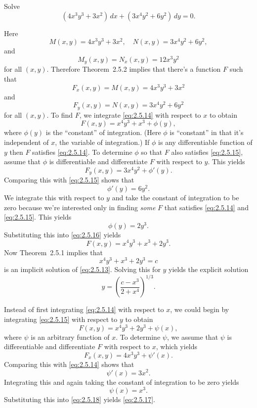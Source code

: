 \setcounter{example}{2}
\setcounter{equation}{12}
\begin{example}
  \label{example:2.5.3} \rm Solve
  \begin{equation}
    \label{eq:2.5.13}(4x^{3}y^{3}+3x^{2})\,dx+(3x^{4}y^{2}+6y^{2})\,dy=0.
  \end{equation}
\end{example}
\setcounter{equation}{13}
\setcounter{figure}{0}
\begin{examplesolution}
 Here
\[
  M(x,y)=4x^{3}y^{3}+3x^{2},\quad N(x,y)=3x^{4}y^{2}+6y^{2},
\]
and
\[
  M_{y}(x,y)=N_{x}(x,y)=12x^{3}y^{2}
\]
for all $(x,y)$. Therefore Theorem~2.5.2 implies that there's a function $F$ such that
\begin{equation}
  \label{eq:2.5.14}F_{x}(x,y)=M(x,y)=4x^{3}y^{3}+3x^{2}
\end{equation}
and
\begin{equation}
  \label{eq:2.5.15}F_{y}(x,y)=N(x,y)=3x^{4}y^{2}+6y^{2}
\end{equation}
for all $(x,y)$. To find $F$, we integrate \eqref{eq:2.5.14} with respect to $x$ to obtain
\begin{equation}
  \label{eq:2.5.16}F(x,y)=x^{4}y^{3}+x^{3}+\phi(y),
\end{equation}
where $\phi(y)$ is the ``constant'' of integration. (Here $\phi$ is ``constant'' in that it's
independent of $x$, the variable of integration.) If $\phi$ is any differentiable function of $y$
then $F$ satisfies \eqref{eq:2.5.14}. To determine $\phi$ so that $F$ also satisfies
\eqref{eq:2.5.15}, assume that $\phi$ is differentiable and differentiate $F$ with respect to $y$.
This yields
\[
  F_{y}(x,y)=3x^{4}y^{2}+\phi'(y).
\]
Comparing this with \eqref{eq:2.5.15} shows that
\[
  \phi'(y)=6y^{2}.
\]
We integrate this with respect to $y$ and take the constant of integration to be zero because we're
interested only in finding {\relax\it some} $F$ that satisfies \eqref{eq:2.5.14} and
\eqref{eq:2.5.15}. This yields
\[
  \phi(y)=2y^{3}.
\]
Substituting this into \eqref{eq:2.5.16} yields
\begin{equation}
  \label{eq:2.5.17}F(x,y)=x^{4}y^{3}+x^{3}+2y^{3}.
\end{equation}
Now Theorem~2.5.1 implies that
\[
  x^{4}y^{3}+x^{3}+2y^{3}=c
\]
is an implicit solution of \eqref{eq:2.5.13}. Solving this for $y$ yields the explicit solution
\[
  y=\left(\frac{c-x^{3}}{2+x^{4}}\right)^{1/3}.
\]

 Instead of first integrating \eqref{eq:2.5.14} with respect to $x$, we could
begin by integrating \eqref{eq:2.5.15} with respect to $y$ to obtain
\begin{equation}
  \label{eq:2.5.18}F(x,y)=x^{4}y^{3}+2y^{3}+\psi(x),
\end{equation}
where $\psi$ is an arbitrary function of $x$. To determine $\psi$, we assume that $\psi$ is
differentiable and differentiate $F$ with respect to $x$, which yields
\[
  F_{x}(x,y)=4x^{3}y^{3}+\psi'(x).
\]
Comparing this with \eqref{eq:2.5.14} shows that
\[
  \psi'(x)=3x^{2}.
\]
Integrating this and again taking the constant of integration to be zero yields
\[
  \psi(x)=x^{3}.
\]
Substituting this into \eqref{eq:2.5.18} yields \eqref{eq:2.5.17}.


\end{examplesolution}
